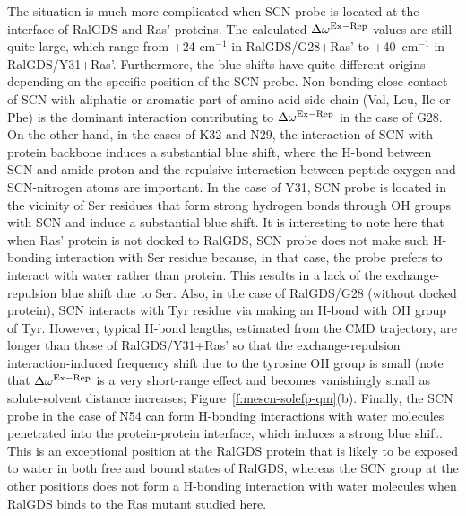 \documentclass[a4paper,titlepage,twoside,fleqn,12pt]{book}
\begin{document}
\begin{refsection}
The situation is much more complicated when SCN probe is
located at the interface of RalGDS and Ras' proteins. 
The calculated $\Delta\omega^{\rm Ex-Rep}$ values are still quite large, which
range from +24 cm$^{-1}$ in RalGDS/G28+Ras' to +40~cm$^{-1}$ in
RalGDS/Y31+Ras'. Furthermore, the blue shifts have quite
different origins depending on the specific position of the SCN
probe. Non\hyp{}bonding close\hyp{}contact of SCN with aliphatic or
aromatic part of amino acid side chain (Val, Leu, Ile or Phe) is
the dominant interaction contributing to $\Delta\omega^{\rm Ex-Rep}$ in the case of
G28. On the other hand, in the cases of K32 and N29, the
interaction of SCN with protein backbone induces a substantial
blue shift, where the H-bond between SCN and amide proton
and the repulsive interaction between peptide\hyp{}oxygen and
SCN-nitrogen atoms are important. In the case of Y31, SCN
probe is located in the vicinity of Ser residues that form strong
hydrogen bonds through OH groups with SCN and induce a
substantial blue shift. It is interesting to note here that when
Ras' protein is not docked to RalGDS, SCN probe does not
make such H-bonding interaction with Ser residue because, in
that case, the probe prefers to interact with water rather than
protein. This results in a lack of the exchange\hyp{}repulsion blue
shift due to Ser. Also, in the case of RalGDS/G28 (without
docked protein), SCN interacts with Tyr residue via making an
H-bond with OH group of Tyr. However, typical H-bond
lengths, estimated from the CMD trajectory, are longer than
those of RalGDS/Y31+Ras' so that the exchange\hyp{}repulsion
interaction\hyp{}induced frequency shift due to the tyrosine OH
group is small (note that $\Delta\omega^{\rm Ex-Rep}$ is a very short\hyp{}range effect
and becomes vanishingly small as solute\hyp{}solvent distance
increases; Figure~\ref{f:mescn-solefp-qm}(b). %
Finally, the SCN probe in the case of
N54 can form H-bonding interactions with water molecules
penetrated into the protein-protein interface, which induces a
strong blue shift. This is an exceptional position at the RalGDS
protein that is likely to be exposed to water in both free and
bound states of RalGDS, whereas the SCN group at the other
positions does not form a H-bonding interaction with water
molecules when RalGDS binds to the Ras mutant studied here.


\end{refsection}
\end{document}

